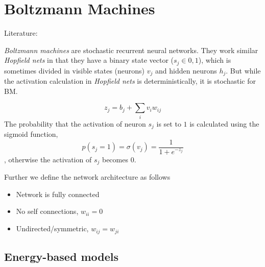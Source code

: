 \section{Boltzmann Machines}\label{sec:bm}%
Literature: \cite{Bengio2009}

\emph{Boltzmann machines} are stochastic recurrent neural networks. They work similar \emph{Hopfield nets} in that they have a binary state vector ($s_j \in {0,1}$), which is sometimes divided in visible states (neurons) $v_j$ and hidden neurons $h_j$. But while the activation calculation in \emph{Hopfield nets} is deterministically, it is stochastic for \gls{BM}.

\begin{equation}
z_j = b_j + \sum_i v_i w_{ij}
\end{equation}
The probability that the activation of neuron $s_j$ is set to $1$ is calculated using the sigmoid function,
\begin{equation}
p(s_j = 1) = \sigma(v_j) = \frac{1}{1 + e^{-z_j}}
\end{equation}
, otherwise the activation of $s_j$ becomes $0$.

Further we define the network architecture as follows
\begin{itemize}
\item Network is fully connected
\item No self connections, $w_{ii}=0$
\item Undirected/symmetric, $w_{ij}=w_{ji}$
\end{itemize}

\subsection{Energy-based models}



